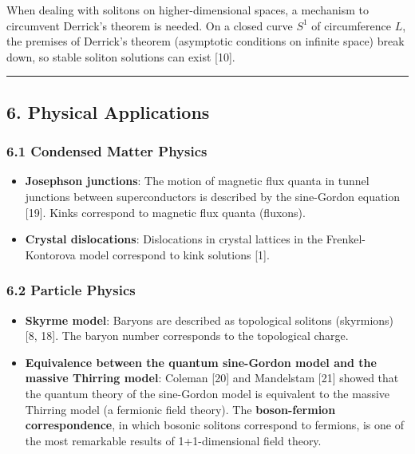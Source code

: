 \documentclass[a4paper,11pt]{article}
\providecommand{\tightlist}{\setlength{\itemsep}{0pt}\setlength{\parskip}{0pt}}
\begin{document}
When dealing with solitons on higher-dimensional spaces, a mechanism to
circumvent Derrick's theorem is needed. On a closed curve \(S^1\) of
circumference \(L\), the premises of Derrick's theorem (asymptotic
conditions on infinite space) break down, so stable soliton solutions
can exist {[}10{]}.

\begin{center}\rule{0.5\linewidth}{0.5pt}\end{center}

\subsection{6. Physical Applications}\label{physical-applications}

\subsubsection{6.1 Condensed Matter
Physics}\label{condensed-matter-physics}

\begin{itemize}
\tightlist
\item
  \textbf{Josephson junctions}: The motion of magnetic flux quanta in
  tunnel junctions between superconductors is described by the
  sine-Gordon equation {[}19{]}. Kinks correspond to magnetic flux
  quanta (fluxons).
\item
  \textbf{Crystal dislocations}: Dislocations in crystal lattices in the
  Frenkel-Kontorova model correspond to kink solutions {[}1{]}.
\end{itemize}

\subsubsection{6.2 Particle Physics}\label{particle-physics}

\begin{itemize}
\tightlist
\item
  \textbf{Skyrme model}: Baryons are described as topological solitons
  (skyrmions) {[}8, 18{]}. The baryon number corresponds to the
  topological charge.
\item
  \textbf{Equivalence between the quantum sine-Gordon model and the
  massive Thirring model}: Coleman {[}20{]} and Mandelstam {[}21{]}
  showed that the quantum theory of the sine-Gordon model is equivalent
  to the massive Thirring model (a fermionic field theory). The
  \textbf{boson-fermion correspondence}, in which bosonic solitons
  correspond to fermions, is one of the most remarkable results of
  1+1-dimensional field theory.
\end{itemize}
\end{document}
